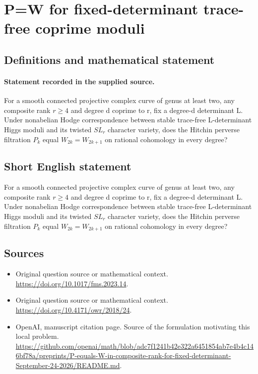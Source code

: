 \documentclass[11pt]{article}
\begin{document}
\section*{P=W for fixed-determinant trace-free coprime moduli}\label{30007058}
\subsection{Definitions and mathematical statement}
\paragraph{Statement recorded in the supplied source.}
For a smooth connected projective complex curve of genus at least two, any composite rank $r\geq 4$ and degree d coprime to r, fix a degree-d determinant L. Under nonabelian Hodge correspondence between stable trace-free L-determinant Higgs moduli and its twisted $SL_r$ character variety, does the Hitchin perverse filtration $P_k$ equal $W_{2k}=W_{2k+1}$ on rational cohomology in every degree?
\subsection{Short English statement}
For a smooth connected projective complex curve of genus at least two, any composite rank $r\geq 4$ and degree d coprime to r, fix a degree-d determinant L. Under nonabelian Hodge correspondence between stable trace-free L-determinant Higgs moduli and its twisted $SL_r$ character variety, does the Hitchin perverse filtration $P_k$ equal $W_{2k}=W_{2k+1}$ on rational cohomology in every degree?
\subsection{Sources}
\begin{itemize}
\item[S1] Original question source or mathematical context.
\url{https://doi.org/10.1017/fms.2023.14}.
\item[S2] Original question source or mathematical context.
\url{https://doi.org/10.4171/owr/2018/24}.
\item[S3] OpenAI, manuscript citation page. Source of the formulation motivating this local problem.
\url{https://github.com/openai/math/blob/adc7f1241b42e322a6451854ab7e4b4c146bf78a/preprints/P-equals-W-in-composite-rank-for-fixed-determinant-September-24-2026/README.md}.
\end{itemize}
\end{document}
